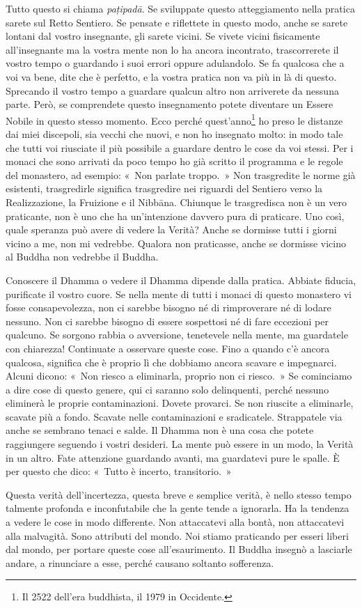 Tutto questo si chiama \emph{paṭipadā}. Se sviluppate questo
atteggiamento nella pratica sarete sul Retto Sentiero. Se pensate e
riflettete in questo modo, anche se sarete lontani dal vostro
insegnante, gli sarete vicini. Se vivete vicini fisicamente
all'insegnante ma la vostra mente non lo ha ancora incontrato,
trascorrerete il vostro tempo o guardando i suoi errori oppure
adulandolo. Se fa qualcosa che a voi va bene, dite che è perfetto, e la
vostra pratica non va più in là di questo. Sprecando il vostro tempo a
guardare qualcun altro non arriverete da nessuna parte. Però, se
comprendete questo insegnamento potete diventare un Essere Nobile in
questo stesso momento. Ecco perché quest'anno\footnote{Il 2522 dell'era
  buddhista, il 1979 in Occidente.} ho preso le distanze dai miei
discepoli, sia vecchi che nuovi, e non ho insegnato molto: in modo tale
che tutti voi riusciate il più possibile a guardare dentro le cose da
voi stessi. Per i monaci che sono arrivati da poco tempo ho già scritto
il programma e le regole del monastero, ad esempio: «~Non parlate
troppo.~» Non trasgredite le norme già esistenti, trasgredirle significa
trasgredire nei riguardi del Sentiero verso la Realizzazione, la
Fruizione e il Nibbāna. Chiunque le trasgredisca non è un vero
praticante, non è uno che ha un'intenzione davvero pura di praticare.
Uno così, quale speranza può avere di vedere la Verità? Anche se
dormisse tutti i giorni vicino a me, non mi vedrebbe. Qualora non
praticasse, anche se dormisse vicino al Buddha non vedrebbe il Buddha.

Conoscere il Dhamma o vedere il Dhamma dipende dalla pratica. Abbiate
fiducia, purificate il vostro cuore. Se nella mente di tutti i monaci di
questo monastero vi fosse consapevolezza, non ci sarebbe bisogno né di
rimproverare né di lodare nessuno. Non ci sarebbe bisogno di essere
sospettosi né di fare eccezioni per qualcuno. Se sorgono rabbia o
avversione, tenetevele nella mente, ma guardatele con chiarezza!
Continuate a osservare queste cose. Fino a quando c'è ancora qualcosa,
significa che è proprio lì che dobbiamo ancora scavare e impegnarci.
Alcuni dicono: «~Non riesco a eliminarla, proprio non ci riesco.~» Se
cominciamo a dire cose di questo genere, qui ci saranno solo
delinquenti, perché nessuno eliminerà le proprie contaminazioni. Dovete
provarci. Se non riuscite a eliminarle, scavate più a fondo. Scavate
nelle contaminazioni e sradicatele. Strappatele via anche se sembrano
tenaci e salde. Il Dhamma non è una cosa che potete raggiungere seguendo
i vostri desideri. La mente può essere in un modo, la Verità in un
altro. Fate attenzione guardando avanti, ma guardatevi pure le spalle. È
per questo che dico: «~Tutto è incerto, transitorio.~»

Questa verità dell'incertezza, questa breve e semplice verità, è nello
stesso tempo talmente profonda e inconfutabile che la gente tende a
ignorarla. Ha la tendenza a vedere le cose in modo differente. Non
attaccatevi alla bontà, non attaccatevi alla malvagità. Sono attributi
del mondo. Noi stiamo praticando per esseri liberi dal mondo, per
portare queste cose all'esaurimento. Il Buddha insegnò a lasciarle
andare, a rinunciare a esse, perché causano soltanto sofferenza.

